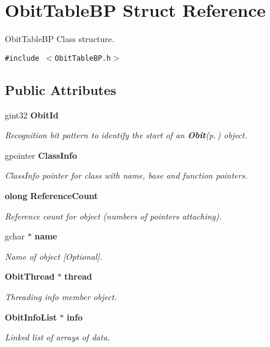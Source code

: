 \section{Obit\-Table\-BP Struct Reference}
\label{structObitTableBP}
Obit\-Table\-BP Class structure.  


{\tt \#include $<$Obit\-Table\-BP.h$>$}

\subsection*{Public Attributes}
\begin{CompactItemize}
\item 
gint32 {\bf Obit\-Id}
\begin{CompactList}\small\item\em Recognition bit pattern to identify the start of an {\bf Obit}{\rm (p.\,\pageref{structObit})} object. \item\end{CompactList}\item 
gpointer {\bf Class\-Info}
\begin{CompactList}\small\item\em Class\-Info pointer for class with name, base and function pointers. \item\end{CompactList}\item 
{\bf olong} {\bf Reference\-Count}
\begin{CompactList}\small\item\em Reference count for object (numbers of pointers attaching). \item\end{CompactList}\item 
gchar $\ast$ {\bf name}
\begin{CompactList}\small\item\em Name of object [Optional]. \item\end{CompactList}\item 
{\bf Obit\-Thread} $\ast$ {\bf thread}
\begin{CompactList}\small\item\em Threading info member object. \item\end{CompactList}\item 
{\bf Obit\-Info\-List} $\ast$ {\bf info}
\begin{CompactList}\small\item\em Linked list of arrays of data. \item\end{CompactList}\item 

\end{CompactItemize}
